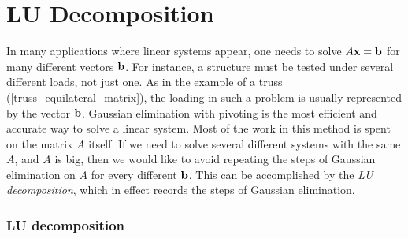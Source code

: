 \begin{list}
  


\end{list}


\chapter{LU Decomposition}

In many applications where linear systems appear, one needs to solve
$A \mathbf{x} = \mathbf{b}$ for many different vectors $\mathbf{b}$. For instance, a
structure must be tested under several different loads, not just one.
As in the example of a truss (\ref{truss_equilateral_matrix}),
the loading in such a problem is usually
represented by the vector $\mathbf{b}$.  Gaussian elimination with pivoting
is the most efficient and accurate way to solve a linear system.  Most
of the work in this method is spent on the matrix $A$ itself.  If we
need to solve several different systems with the same $A$, and $A$ is
big, then we would like to avoid repeating the steps of Gaussian
elimination on $A$ for every different $\mathbf{b}$. This can be accomplished
by the {\em LU decomposition}, which in effect records the steps of
Gaussian elimination.


\subsection*{LU decomposition}

